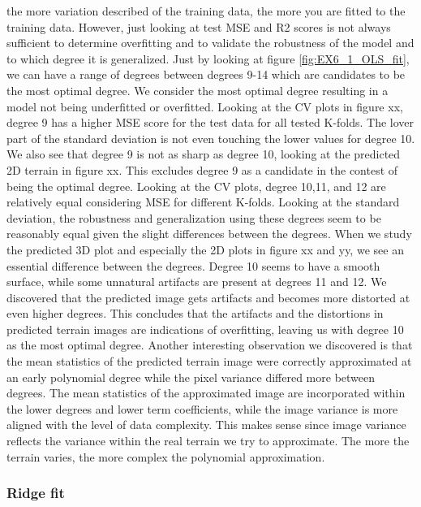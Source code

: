 \documentclass[11pt, a4paper]{article}
\begin{document}
the more variation described of the training data, the more you are fitted to the training data. However, just looking at test MSE and R2 scores is not always sufficient
to determine overfitting and to validate the robustness of the model and to which degree it is generalized. Just by looking at figure \ref{fig:EX6_1_OLS_fit}, we can have a range of degrees 
between degrees 9-14 which are candidates to be the most optimal degree. We consider the most optimal degree resulting in a model not being underfitted or overfitted. 
Looking at the CV plots in figure xx, degree 9 has a higher MSE score for the test data for all tested K-folds. The lover part of the standard deviation is not even touching
the lower values for degree 10. We also see that degree 9 is not as sharp as degree 10, looking at the predicted 2D terrain in figure xx. This excludes degree 9 as a candidate
in the contest of being the optimal degree. Looking at the CV plots, degree 10,11, and 12 are relatively equal considering MSE for different K-folds. Looking at the standard deviation,
the robustness and generalization using these degrees seem to be reasonably equal given the slight differences between the degrees. When we study the predicted 3D plot and especially
the 2D plots in figure xx and yy, we see an essential difference between the degrees. Degree 10 seems to have a smooth surface, while some unnatural artifacts are present at degrees 11 and 12.
We discovered that the predicted image gets artifacts and becomes more distorted at even higher degrees. This concludes that the artifacts and the distortions in predicted 
terrain images are indications of overfitting, leaving us with degree 10 as the most optimal degree. Another interesting observation we discovered is that the mean statistics 
of the predicted terrain image were correctly approximated at an early polynomial degree while the pixel variance differed more between degrees. The mean statistics of the 
approximated image are incorporated within the lower degrees and lower term coefficients, while the image variance is more aligned with the level of data complexity. 
This makes sense since image variance reflects the variance within the real terrain we try to approximate. The more the terrain varies, the more complex the polynomial approximation. 

\subsubsection*{Ridge fit}
\end{document}
